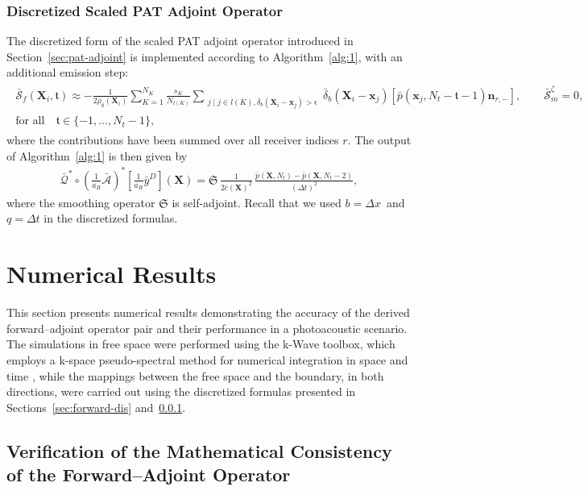 \documentclass[11pt,reqno]{amsart}
\theoremstyle{remark}
\newcommand{\bx}{\boldsymbol{x}}
\newcommand{\bn}{\boldsymbol{n}}
\newcommand{\bX}{\boldsymbol{X}}
\newcommand{\bt}{\mathfrak{t}}
\begin{document}
\subsubsection{Discretized Scaled PAT Adjoint Operator}  \label{sec:adjoint-dis}

The discretized form of the scaled PAT adjoint operator introduced in Section~\ref{sec:pat-adjoint} is implemented according to Algorithm~\ref{alg:1}, with an additional emission step:
\begin{align} \label{eq:adjoint-emission-dis}
\begin{split}
   \bar{\boldsymbol{\mathcal{S}}}_f (\bX_i, \bt) \approx -\frac{1}{2 \bar{\rho}_0(\bX_i)} \sum_{K=1}^{N_K} \frac{s_K}{N_{l(K)}}
   \sum_{\substack{ j \mid j \in l(K), \bar{\delta}_b(\bX_i- \bx_j) > \epsilon}}
   \bar{\delta}_b(\bX_i - \bx_j)  
   \left[\bar{p}(\bx_j, N_t- \bt-1) \bn_{r,-} \right], 
   \qquad 
   \bar{\mathcal{S}}_m^\zeta = 0,\\
   \text{for all} \quad  \bt \in \{-1, \ldots, N_t-1\},
\end{split}
\end{align}
where the contributions have been summed over all receiver indices \(r\). The output of Algorithm~\ref{alg:1} is then given by
\begin{align}  \label{eq:source-adjoint-dis}
\bar{\mathcal{Q}}^* \circ \left(\frac{1}{a_R} \bar{\mathcal{A}}\right)^* [ \frac{1}{a_R} \bar{y}^D](\bX)
= \mathfrak{S} \,  \frac{1}{2 \bar{c}(\bX)^2}  \,\frac{ \bar{p}(\bX,N_t) - \bar{p}(\bX,N_t-2)}{(\Delta t)^2},
\end{align}
where the smoothing operator \( \mathfrak{S} \) is self-adjoint.  Recall that we used \(b=\Delta x\)~and~\(q=\Delta t\) in the discretized formulas.

\section{Numerical Results}
This section presents numerical results demonstrating the accuracy of the derived forward--adjoint operator pair and their performance in a photoacoustic scenario. The simulations in free space were performed using the k-Wave toolbox, which employs a k-space pseudo-spectral method for numerical integration in space and time \cite{Treeby2010}, while the mappings between the free space and the boundary, in both directions, were carried out using the discretized formulas presented in Sections~\ref{sec:forward-dis} and~\ref{sec:adjoint-dis}.


\subsection{Verification of the Mathematical Consistency of the Forward--Adjoint Operator}
\end{document}
